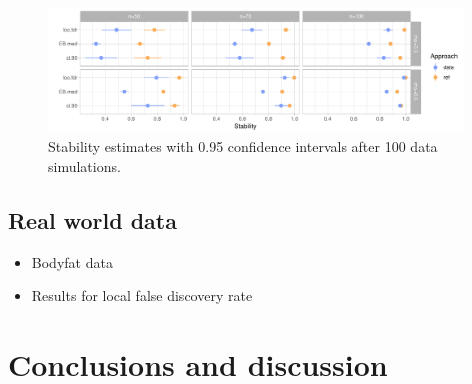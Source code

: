 \documentclass[american,]{article}
\theoremstyle{definition}
\begin{document}
\begin{figure}[tp]
  \centering
  \includegraphics[width=0.98\textwidth]{graphics/stability.pdf}
  \caption{Stability estimates with 0.95 confidence intervals after 100 data simulations.\\}
  \label{fig:stability}
\end{figure}




\hypertarget{real-world-data}{%
\subsection{Real world data}\label{real-world-data}}

\begin{itemize}
\item Bodyfat data
\item Results for local false discovery rate
\end{itemize}

\hypertarget{conclusions}{%
\section{Conclusions and discussion}\label{conclusions}}



\end{document}
